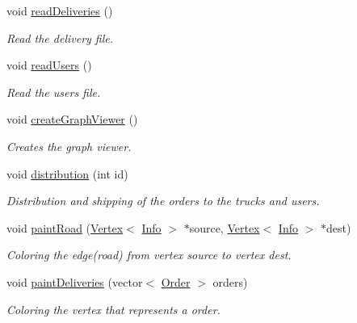 \begin{DoxyCompactItemize}
void \hyperlink{class_company_a3354d9b8df72709b55edeaf14af14530}{read\+Deliveries} ()
\begin{DoxyCompactList}\small\item\em Read the delivery file. \end{DoxyCompactList}\item 
\mbox{\label{class_company_aa1add2b87e0d8d20cb1151b633821cc5}} 
void \hyperlink{class_company_aa1add2b87e0d8d20cb1151b633821cc5}{read\+Users} ()
\begin{DoxyCompactList}\small\item\em Read the users file. \end{DoxyCompactList}\item 
\mbox{\label{class_company_af64bc7caa64b0c8dff8509b3567854db}} 
void \hyperlink{class_company_af64bc7caa64b0c8dff8509b3567854db}{create\+Graph\+Viewer} ()
\begin{DoxyCompactList}\small\item\em Creates the graph viewer. \end{DoxyCompactList}\item 
\mbox{\label{class_company_a1e8265128584c21d8cdb826a776fb2e7}} 
void \hyperlink{class_company_a1e8265128584c21d8cdb826a776fb2e7}{distribution} (int id)
\begin{DoxyCompactList}\small\item\em Distribution and shipping of the orders to the trucks and users. \end{DoxyCompactList}\item 
void \hyperlink{class_company_a7511f8d62b4ab7640d8c00fb105cd6e2}{paint\+Road} (\hyperlink{class_vertex}{Vertex}$<$ \hyperlink{class_info}{Info} $>$ $\ast$source, \hyperlink{class_vertex}{Vertex}$<$ \hyperlink{class_info}{Info} $>$ $\ast$dest)
\begin{DoxyCompactList}\small\item\em Coloring the edge(road) from vertex source to vertex dest. \end{DoxyCompactList}\item 
void \hyperlink{class_company_ac6798bd8fb544d3297cb8b11becb5014}{paint\+Deliveries} (vector$<$ \hyperlink{class_order}{Order} $>$ orders)
\begin{DoxyCompactList}\small\item\em Coloring the vertex that represents a order. \end{DoxyCompactList}\item 

\end{DoxyCompactItemize}
